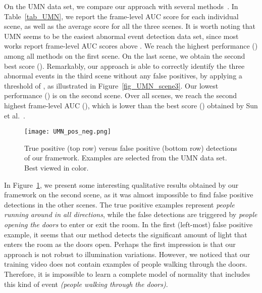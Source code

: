 \documentclass[10pt,twocolumn,letterpaper]{article}
\begin{document}
On the UMN data set, we compare our approach with several methods~\cite{Cong-CVPR-2011,Giorno-ECCV-2016,Ionescu-ICCV-2017,Mehran-CVPR-2009,Ravanbakhsh-ICIP-2017,Saligrama-CVPR-2012,Smeureanu-ICIAP-2017,Sun-PR-2017,Zhang-PR-2016}. In Table~\ref{tab_UMN}, we report the frame-level AUC score for each individual scene, as well as the average score for all the three scenes. It is worth noting that UMN seems to be the easiest abnormal event detection data set, since most works report frame-level AUC scores above . We reach the highest performance () among all methods on the first scene. On the last scene, we obtain the second best score (). Remarkably, our approach is able to correctly identify the three abnormal events in the third scene without any false positives, by applying a threshold of , as illustrated in Figure~\ref{fig_UMN_scene3}. Our lowest performance () is on the second scene. Over all scenes, we reach the second highest frame-level AUC (), which is  lower than the best score () obtained by Sun et al.~\cite{Sun-PR-2017}.

\begin{figure}[!t]
\begin{center}
\texttt{[image: UMN\_pos\_neg.png]}
\end{center}
\vspace*{-0.3cm}
\caption{True positive (top row) versus false positive (bottom row) detections of our framework. Examples are selected from the UMN data set. Best viewed in color.}
\label{fig_UMN_pos_neg}
\vspace*{-0.4cm}
\end{figure}

In Figure~\ref{fig_UMN_pos_neg}, we present some interesting qualitative results obtained by our framework on the second scene, as it was almost impossible to find false positive detections in the other scenes. The true positive examples represent \emph{people running around in all directions}, while the false detections are triggered by \emph{people opening the doors} to enter or exit the room. In the first (left-most) false positive example, it seems that our method detects the significant amount of light that enters the room as the doors open. Perhaps the first impression is that our approach is not robust to illumination variations. However, we noticed that our training video does not contain examples of people walking through the doors. Therefore, it is impossible to learn a complete model of normality that includes this kind of event \emph{(people walking through the doors)}.
\end{document}

